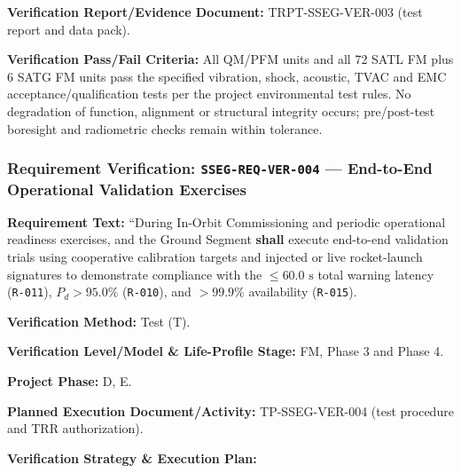 \par\textbf{Verification Report/Evidence Document:} TRPT-SSEG-VER-003 (test report and data pack).
\par\textbf{Verification Pass/Fail Criteria:} All QM/PFM units and all 72 SATL FM plus 6 SATG FM units pass the specified vibration, shock, acoustic, TVAC and EMC acceptance/qualification tests per the project environmental test rules. No degradation of function, alignment or structural integrity occurs; pre/post-test boresight and radiometric checks remain within tolerance.
\par\medskip
\subsubsection{Requirement Verification: \texttt{SSEG-REQ-VER-004} --- End-to-End Operational Validation Exercises}
\label{ver:SSEG-REQ-VER-004}
\textbf{Requirement Text:} ``During In-Orbit Commissioning and periodic operational readiness exercises,  and the Ground Segment \textbf{shall} execute end-to-end validation trials using cooperative calibration targets and injected or live rocket-launch signatures to demonstrate compliance with the $\le 60.0\text{ s}$ total warning latency (\texttt{R-011}), $P_d > 95.0\%$ (\texttt{R-010}), and $> 99.9\%$ availability (\texttt{R-015}).
\par\textbf{Verification Method:} Test (T).
\par\textbf{Verification Level/Model \& Life-Profile Stage:} FM, Phase 3 and Phase 4.
\par\textbf{Project Phase:} D, E.
\par\textbf{Planned Execution Document/Activity:} TP-SSEG-VER-004 (test procedure and TRR authorization).
\par\textbf{Verification Strategy \& Execution Plan:}
